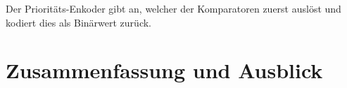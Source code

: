 \documentclass[12pt, a4paper]{article}
\theoremstyle{definition}
\theoremstyle{remark}
\begin{document}

Der Prioritäts-Enkoder gibt an, welcher der Komparatoren zuerst auslöst und kodiert dies als Binärwert zurück.

\section{Zusammenfassung und Ausblick}
\label{sec:ausblick}
\end{document}

